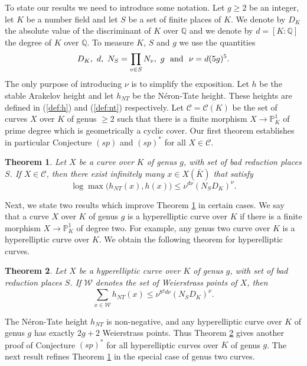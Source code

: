 \documentclass[11pt]{article}
\newtheorem{theorem}{Theorem}[section]
\numberwithin{equation}{section}
\newcommand {\QQ}  {{\mathbb Q}}
\newcommand {\cc} {sp}
\newcommand {\bb} {(sp)^*}
\newcommand {\p} {x}
\begin{document}
To state our results we need to introduce some notation. Let $g\geq 2$ be an integer, let $K$ be a number field and 
let $S$ be a set of finite places of $K$. We denote by $D_K$  the absolute value of the discriminant of $K$ over $\QQ$ and we denote by $d=[K:\QQ]$  the degree of $K$ over $\QQ$. 
To measure $K$, $S$ and $g$ we use the quantities
\begin{equation}\label{def:para}
D_K, \ d, \ N_S=\prod_{v\in S} N_v, \ g \ \textnormal{ and }  \ \nu=d(5g)^{5}.
\end{equation}
The only purpose of introducing $\nu$ is to simplify the exposition.
Let $h$ be the stable Arakelov height and let $h_{NT}$ be the N\'eron-Tate height. These heights are defined in (\ref{def:h}) and (\ref{def:nt}) respectively. 
Let $\mathcal C=\mathcal C(K)$ be the set of curves $X$ over $K$ of genus $\geq 2$ such that there is a finite morphism $X\to \mathbb P^1_K$ of prime degree which is geometrically a cyclic cover. 
Our first theorem establishes in particular Conjecture $(\cc)$ and  $\bb$ for all $X\in\mathcal C$. 
\begin{theorem}\label{thm:cyclic}
Let $X$ be a curve over $K$ of genus $g$, with set of bad reduction places $S$. If $X\in\mathcal C$, then there exist infinitely many $\p\in X(\bar{K})$ that satisfy
$$\log\max \bigl(h_{NT}(\p),h(\p)\bigl)\leq \nu^{d\nu}(N_SD_K)^\nu.$$
\end{theorem}

Next, we  state two results which improve Theorem \ref{thm:cyclic} in certain cases. We say that a curve $X$ over $K$ of genus $g$ is a hyperelliptic curve over $K$ if there is a finite morphism $X\to \mathbb P^1_K$ of degree two. For example, any genus two curve over $K$ is a hyperelliptic curve over $K$. We obtain the following theorem for hyperelliptic curves.

\begin{theorem}\label{thm:hyper}
Let $X$ be a hyperelliptic curve over $K$ of genus $g$, with set of bad reduction places $S$. If $\mathcal W$ denotes the set of Weierstrass points of $X$, then $$\sum_{\p\in \mathcal W}h_{NT}(\p)\leq \nu^{8^gd\nu}(N_SD_K)^\nu.$$
\end{theorem}
The N\'eron-Tate height $h_{NT}$ is non-negative, 
and any hyperelliptic curve over $K$ of genus $g$ has exactly $2g+2$ Weierstrass points. Thus Theorem \ref{thm:hyper} gives another proof of Conjecture $\bb$ for all hyperelliptic curves over $K$ of genus $g$. The next result refines  Theorem \ref{thm:cyclic} in the special case of genus two curves.
\end{document}
